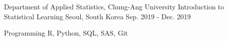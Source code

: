 \documentclass[11pt, a4paper]{awesome-cv} %
\begin{document}
\begin{cventries}
	\cventry
	{Department of Applied Statistics, Chung-Ang University} %
	{Introduction to Statistical Learning} %
	{Seoul, South Korea} %
	{Sep. 2019 - Dec. 2019} %
	{} %
\end{cventries}


\begin{cvskills}
	\cvskill
	{Programming} %
	{R, Python, SQL, SAS, Git} %
	
%	
%	
%	
\end{cvskills}

\end{document}
